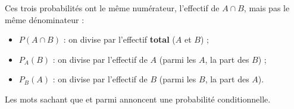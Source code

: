 \documentclass[11pt,a4paper]{article}
\begin{document}
\begin{remarquebox}
Ces trois probabilités ont le même numérateur, l'effectif de $A\cap B$, mais pas le même
dénominateur :
\begin{itemize}
  \item $P(A\cap B)$ : on divise par l'effectif \textbf{total} (\og $A$ et $B$\fg{}) ;
  \item $P_A(B)$ : on divise par l'effectif de $A$ (\og parmi les $A$, la part des $B$\fg{}) ;
  \item $P_B(A)$ : on divise par l'effectif de $B$ (\og parmi les $B$, la part des $A$\fg{}).
\end{itemize}
Les mots \og sachant que\fg{} et \og parmi\fg{} annoncent une probabilité conditionnelle.
\end{remarquebox}
\end{document}
